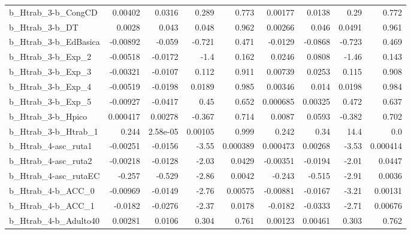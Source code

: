 \begin{tabular}{lrrrrrrrr}
b\_Htrab\_3-b\_CongCD         &     0.00402 &       0.0316 &    0.289 &    0.773 &    0.00177 &      0.0138 &         0.29 &         0.772 \\
b\_Htrab\_3-b\_DT             &      0.0028 &        0.043 &    0.048 &    0.962 &    0.00266 &       0.046 &       0.0491 &         0.961 \\
b\_Htrab\_3-b\_EdBasica       &    -0.00892 &       -0.059 &   -0.721 &    0.471 &    -0.0129 &     -0.0868 &       -0.723 &         0.469 \\
b\_Htrab\_3-b\_Exp\_2          &    -0.00518 &      -0.0172 &     -1.4 &    0.162 &     0.0246 &      0.0808 &        -1.46 &         0.143 \\
b\_Htrab\_3-b\_Exp\_3          &    -0.00321 &      -0.0107 &    0.112 &    0.911 &    0.00739 &      0.0253 &        0.115 &         0.908 \\
b\_Htrab\_3-b\_Exp\_4          &    -0.00519 &      -0.0198 &   0.0189 &    0.985 &    0.00346 &       0.014 &       0.0198 &         0.984 \\
b\_Htrab\_3-b\_Exp\_5          &    -0.00927 &      -0.0417 &     0.45 &    0.652 &   0.000685 &     0.00325 &        0.472 &         0.637 \\
b\_Htrab\_3-b\_Hpico          &    0.000417 &      0.00278 &   -0.367 &    0.714 &     0.0087 &      0.0593 &       -0.382 &         0.702 \\
b\_Htrab\_3-b\_Htrab\_1        &       0.244 &     2.58e-05 &  0.00105 &    0.999 &      0.242 &        0.34 &         14.4 &           0.0 \\
b\_Htrab\_4-asc\_ruta1        &    -0.00251 &      -0.0156 &    -3.55 & 0.000389 &   0.000473 &     0.00268 &        -3.53 &      0.000414 \\
b\_Htrab\_4-asc\_ruta2        &    -0.00218 &      -0.0128 &    -2.03 &   0.0429 &   -0.00351 &     -0.0194 &        -2.01 &        0.0447 \\
b\_Htrab\_4-asc\_rutaEC       &      -0.257 &       -0.529 &    -2.86 &   0.0042 &     -0.243 &      -0.515 &        -2.91 &        0.0036 \\
b\_Htrab\_4-b\_ACC\_0          &    -0.00969 &      -0.0149 &    -2.76 &  0.00575 &   -0.00881 &     -0.0167 &        -3.21 &       0.00131 \\
b\_Htrab\_4-b\_ACC\_1          &     -0.0182 &      -0.0276 &    -2.37 &   0.0178 &    -0.0182 &     -0.0333 &        -2.71 &       0.00676 \\
b\_Htrab\_4-b\_Adulto40       &     0.00281 &       0.0106 &    0.304 &    0.761 &    0.00123 &     0.00461 &        0.303 &         0.762 \\

\end{tabular}
